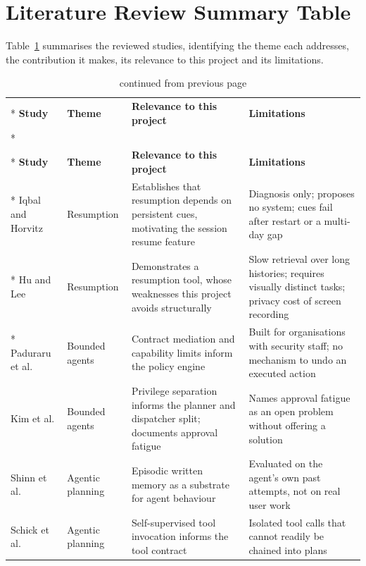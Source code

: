 \documentclass{FastFyp}
\begin{document}
\section{Literature Review Summary Table}
Table~\ref{tab:lr} summarises the reviewed studies, identifying the theme each addresses, the contribution it makes, its relevance to this project and its limitations.

{\small
{}
\begin{longtable}{|p{2.6cm}|p{2.0cm}|p{3.6cm}|p{4.6cm}|}
\caption{Summary of the reviewed literature.}\label{tab:lr}\\*
\hline
\textbf{Study} & \textbf{Theme} & \textbf{Relevance to this project} & \textbf{Limitations} \\*
\hline
\endfirsthead
\caption[]{continued from previous page}\\*
\hline
\textbf{Study} & \textbf{Theme} & \textbf{Relevance to this project} & \textbf{Limitations} \\*
\hline
\endhead
\hline
Iqbal and Horvitz \cite{ref:iqbal2007} & Resumption & Establishes that resumption depends on persistent cues, motivating the session resume feature & Diagnosis only; proposes no system; cues fail after restart or a multi-day gap \\*
\hline
Hu and Lee \cite{ref:hu2020} & Resumption & Demonstrates a resumption tool, whose weaknesses this project avoids structurally & Slow retrieval over long histories; requires visually distinct tasks; privacy cost of screen recording \\*
\hline
Paduraru et al. \cite{ref:paduraru2026} & Bounded agents & Contract mediation and capability limits inform the policy engine & Built for organisations with security staff; no mechanism to undo an executed action \\
\hline
Kim et al. \cite{ref:kim2026} & Bounded agents & Privilege separation informs the planner and dispatcher split; documents approval fatigue & Names approval fatigue as an open problem without offering a solution \\
\hline
Shinn et al. \cite{ref:shinn2023} & Agentic planning & Episodic written memory as a substrate for agent behaviour & Evaluated on the agent's own past attempts, not on real user work \\
\hline
Schick et al. \cite{ref:schick2023} & Agentic planning & Self-supervised tool invocation informs the tool contract & Isolated tool calls that cannot readily be chained into plans \\

\end{longtable}}
\end{document}
